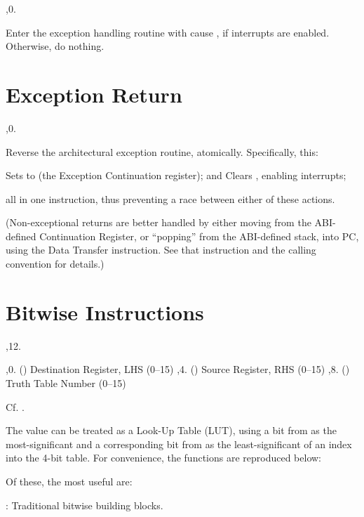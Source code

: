 \noindent\ins{},0. 

Enter the exception handling routine with cause  , if
interrupts are enabled. Otherwise, do nothing.

\section{Exception Return}

\noindent\ins{},0. 

Reverse the architectural exception routine, atomically. Specifically, this:

\li Sets  to  (the Exception Continuation register); and
\li Clears , enabling interrupts;

all in one instruction, thus preventing a race between either of these actions.

(Non-exceptional returns are better handled by either moving from the
ABI-defined Continuation Register, or ``popping'' from the ABI-defined stack,
into PC, using the  Data Transfer instruction. See that instruction
and the calling convention for details.)

\section{Bitwise Instructions}

\noindent\ins{},12. 

\li \ins{},0. () Destination Register, LHS (0--15)
\li \ins{},4. () Source Register, RHS (0--15)
\li \ins{},8. () Truth Table Number (0--15)

Cf.  .

The value  can be treated as a Look-Up Table (LUT), using a bit from
 as the most-significant and a corresponding bit from  as the
least-significant of an index into the 4-bit table. For convenience, the
functions are reproduced below:

\bigskip
{
	\tabskip=3pt
}
\bigskip

Of these, the most useful are:

: Traditional bitwise building blocks.

